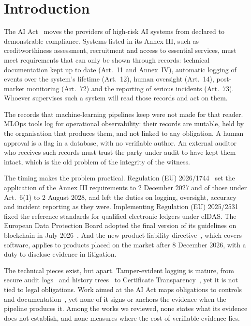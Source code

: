 \section{Introduction}
\label{sec:introduction}

The AI Act~\cite{ai_act} moves the providers of high-risk AI systems from declared to demonstrable compliance. Systems listed in its Annex III, such as creditworthiness assessment, recruitment and access to essential services, must meet requirements that can only be shown through records: technical documentation kept up to date (Art.~11 and Annex~IV), automatic logging of events over the system's lifetime (Art.~12), human oversight (Art.~14), post-market monitoring (Art.~72) and the reporting of serious incidents (Art.~73). Whoever supervises such a system will read those records and act on them.

The records that machine-learning pipelines keep were not made for that reader. MLOps tools log for operational observability: their records are mutable, held by the organisation that produces them, and not linked to any obligation. A human approval is a flag in a database, with no verifiable author. An external auditor who receives such records must trust the party under audit to have kept them intact, which is the old problem of the integrity of the witness.

The timing makes the problem practical. Regulation (EU) 2026/1744~\cite{omnibus_2026} set the application of the Annex III requirements to 2 December 2027 and of those under Art.~6(1) to 2 August 2028, and left the duties on logging, oversight, accuracy and incident reporting as they were. Implementing Regulation (EU) 2025/2531~\cite{qel_2025} fixed the reference standards for qualified electronic ledgers under eIDAS. The European Data Protection Board adopted the final version of its guidelines on blockchain in July 2026~\cite{edpb_2026}. And the new product liability directive~\cite{pld_2024}, which covers software, applies to products placed on the market after 8 December 2026, with a duty to disclose evidence in litigation.

The technical pieces exist, but apart. Tamper-evident logging is mature, from secure audit logs~\cite{schneier1999} and history trees~\cite{crosby2009} to Certificate Transparency~\cite{rfc9162}, yet it is not tied to legal obligations. Work aimed at the AI Act maps obligations to controls and documentation~\cite{lucaj2025,ugarte2026,buscemi2026,palumbo2025,ramos2024}, yet none of it signs or anchors the evidence when the pipeline produces it. Among the works we reviewed, none states what its evidence does not establish, and none measures where the cost of verifiable evidence lies.

